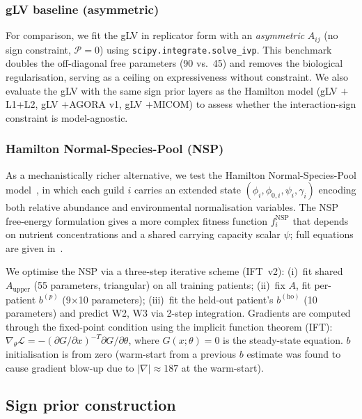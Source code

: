 \documentclass[11pt,a4paper]{article}
\newcommand{\calP}{\mathcal{P}}
\begin{document}
\subsubsection{gLV baseline (asymmetric)}
\label{sssec:glv}

For comparison, we fit the gLV in replicator form with an \emph{asymmetric}
$A_{ij}$ (no sign constraint, $\calP=0$) using \texttt{scipy.integrate.solve\_ivp}.
This benchmark doubles the off-diagonal free parameters (90 vs.\ 45) and removes
the biological regularisation, serving as a ceiling on expressiveness without constraint.
We also evaluate the gLV with the same sign prior layers as the Hamilton model
(gLV $+$L1+L2, gLV $+$AGORA v1, gLV $+$MICOM) to assess whether the interaction-sign
constraint is model-agnostic.

\subsubsection{Hamilton Normal-Species-Pool (NSP)}
\label{sssec:nsp}

As a mechanistically richer alternative, we test the Hamilton Normal-Species-Pool
model~\citep{junker2021}, in which each guild $i$ carries an extended state
$(\phi_i, \phi_{0,i}, \psi_i, \gamma_i)$ encoding both relative abundance and
environmental normalisation variables. The NSP free-energy formulation gives a
more complex fitness function $f_i^{\text{NSP}}$ that depends on nutrient
concentrations and a shared carrying capacity scalar $\psi$; full equations are
given in~\citet{klempt2024, klempt2025}.

We optimise the NSP via a three-step iterative scheme (IFT~v2):
(i)~fit shared $A_{\text{upper}}$ (55 parameters, triangular) on all training patients;
(ii)~fix $A$, fit per-patient $b^{(p)}$ (9$\times$10 parameters);
(iii)~fit the held-out patient's $b^{(\text{ho})}$ (10 parameters) and predict
W2, W3 via 2-step integration.
Gradients are computed through the fixed-point condition using the implicit function
theorem (IFT): $\nabla_\theta \mathcal{L} = -(\partial G/\partial x)^{-T}\partial G/\partial\theta$,
where $G(x;\theta)=0$ is the steady-state equation.
$b$ initialisation is from zero (warm-start from a previous $b$ estimate was found
to cause gradient blow-up due to $|\nabla|\approx 187$ at the warm-start).

\subsection{Sign prior construction}
\label{ssec:prior}
\end{document}
